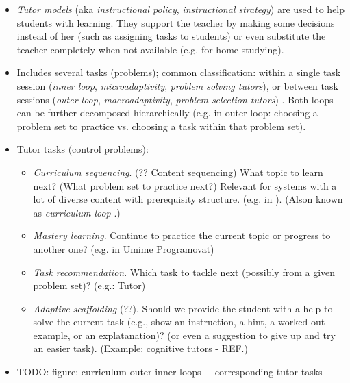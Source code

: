 \begin{itemize}
\item \emph{Tutor models} (aka \emph{instructional policy}, \emph{instructional
  strategy}) are used to help students with learning.
  They support the teacher by making some decisions instead of her
  (such as assigning tasks to students)
  or even substitute the teacher completely when not available
  (e.g. for home studying).
\item Includes several tasks (problems); common classification:
  within a single task session
  (\emph{inner loop}, \emph{microadaptivity}, \emph{problem solving tutors}),
  or between task sessions
  (\emph{outer loop}, \emph{macroadaptivity}, \emph{problem selection tutors})
  \cite{its-learner-models}.
  Both loops can be further decomposed hierarchically
  (e.g. in outer loop: choosing a problem set to practice vs. choosing a task
  within that problem set).
\item Tutor tasks (control problems):
\begin{itemize}
\item \emph{Curriculum sequencing}. (?? Content sequencing)
  What topic to learn next? (What problem set to practice next?)
  Relevant for systems with a lot of diverse content with prerequisity structure.
  (e.g. in \cite{its-programming}).  %
  (Alson known as \emph{curriculum loop} \cite{its-learner-models}.)
\item \emph{Mastery learning}.
  Continue to practice the current topic or progress to another one?
  (e.g. in Umime Programovat)
\item \emph{Task recommendation}.
  Which task to tackle next (possibly from a given problem set)?
 (e.g.: Tutor)
\item \emph{Adaptive scaffolding} (??).
  Should we provide the student with a help to solve the current task
  (e.g., show an instruction, a hint, a worked out example, or an explatanation)?
  (or even a suggestion to give up and try an easier task).
  (Example: cognitive tutors - REF.)
\end{itemize}
\item TODO: figure: curriculum-outer-inner loops + corresponding tutor tasks


\end{itemize}
